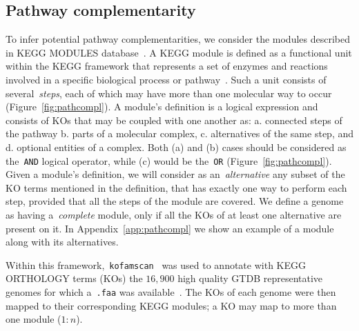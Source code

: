 \documentclass[sn-mathphys,Numbered]{sn-jnl}  %
\theoremstyle{thmstyleone}%
\theoremstyle{thmstyletwo}%
\theoremstyle{thmstylethree}%
\begin{document}
    \subsection*{Pathway complementarity}
    \label{subsec:path-compl}


        To infer potential pathway complementarities, we consider the modules described in KEGG MODULES database~\cite{keggmodulesdb}.
        A KEGG module is defined as a functional unit within the KEGG framework that represents a set of enzymes and reactions involved in a specific biological process or pathway~\cite{muto2013modular}.
        Such a unit consists of several~\textit{steps}, each of which may have more than one molecular way to occur (Figure~\ref{fig:pathcompl}).
        A module's definition is a logical expression and consists of KOs 
        that may be coupled with one another as:
            a. connected steps of the pathway
            b. parts of a molecular complex, 
            c. alternatives of the same step, and 
            d. optional entities of a complex.
        Both (a) and (b) cases should be considered as the~\texttt{AND} logical operator, while (c) would be the~\texttt{OR} (Figure~\ref{fig:pathcompl}).
        Given a module's definition, we will consider as an~\textit{alternative} any subset of the KO terms mentioned in the definition, 
        that has exactly one way to perform each step, provided that all the steps of the module are covered.
        We define a genome as having a~\textit{complete} module, only if all the KOs of at least one alternative are present on it.
        In Appendix~\ref{app:pathcompl} we show an example of a module along with its alternatives.

        Within this framework,~\texttt{kofamscan}~\cite{aramaki2020kofamkoala} was used to annotate with KEGG ORTHOLOGY terms (KOs) the $16,900$ high quality GTDB representative genomes for which a~\texttt{.faa} was available~\cite{kanehisa2012kegg}.
        The KOs of each genome were then mapped to their corresponding KEGG modules; a KO may map to more than one module ($1:n$).
\end{document}
